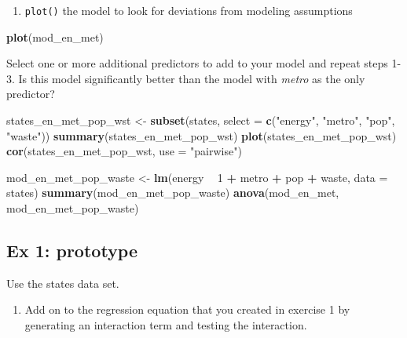 \documentclass[]{book}
\newenvironment{Shaded}{\begin{snugshade}}{\end{snugshade}}
\newcommand{\DataTypeTok}[1]{\textcolor[rgb]{0.13,0.29,0.53}{#1}}
\newcommand{\DecValTok}[1]{\textcolor[rgb]{0.00,0.00,0.81}{#1}}
\newcommand{\KeywordTok}[1]{\textcolor[rgb]{0.13,0.29,0.53}{\textbf{#1}}}
\newcommand{\NormalTok}[1]{#1}
\newcommand{\OperatorTok}[1]{\textcolor[rgb]{0.81,0.36,0.00}{\textbf{#1}}}
\newcommand{\StringTok}[1]{\textcolor[rgb]{0.31,0.60,0.02}{#1}}
\providecommand{\tightlist}{%
  \setlength{\itemsep}{0pt}\setlength{\parskip}{0pt}}
\begin{document}
\begin{enumerate}
\def\labelenumi{\arabic{enumi}.}
\setcounter{enumi}{2}
\tightlist
\item
  \texttt{plot()} the model to look for deviations from modeling assumptions
\end{enumerate}

\begin{Shaded}
\begin{Highlighting}[]
  \KeywordTok{plot}\NormalTok{(mod_en_met)}
\end{Highlighting}
\end{Shaded}

Select one or more additional predictors to add to your model and repeat steps 1-3. Is this model significantly better than the model with \emph{metro} as the only predictor?

\begin{Shaded}
\begin{Highlighting}[]
\NormalTok{  states_en_met_pop_wst <-}\StringTok{ }\KeywordTok{subset}\NormalTok{(states, }\DataTypeTok{select =} \KeywordTok{c}\NormalTok{(}\StringTok{"energy"}\NormalTok{, }\StringTok{"metro"}\NormalTok{, }\StringTok{"pop"}\NormalTok{, }\StringTok{"waste"}\NormalTok{))}
  \KeywordTok{summary}\NormalTok{(states_en_met_pop_wst)}
  \KeywordTok{plot}\NormalTok{(states_en_met_pop_wst)}
  \KeywordTok{cor}\NormalTok{(states_en_met_pop_wst, }\DataTypeTok{use =} \StringTok{"pairwise"}\NormalTok{)}

\NormalTok{  mod_en_met_pop_waste <-}\StringTok{ }\KeywordTok{lm}\NormalTok{(energy }\OperatorTok{~}\StringTok{ }\DecValTok{1} \OperatorTok{+}\StringTok{ }\NormalTok{metro }\OperatorTok{+}\StringTok{ }\NormalTok{pop }\OperatorTok{+}\StringTok{ }\NormalTok{waste, }\DataTypeTok{data =}\NormalTok{ states)}
  \KeywordTok{summary}\NormalTok{(mod_en_met_pop_waste)}
  \KeywordTok{anova}\NormalTok{(mod_en_met, mod_en_met_pop_waste)}
\end{Highlighting}
\end{Shaded}

\hypertarget{ex-1-prototype-1}{%
\subsection{Ex 1: prototype}\label{ex-1-prototype-1}}

Use the states data set.

\begin{enumerate}
\def\labelenumi{\arabic{enumi}.}
\tightlist
\item
  Add on to the regression equation that you created in exercise 1 by generating an interaction term and testing the interaction.
\end{enumerate}
\end{document}
